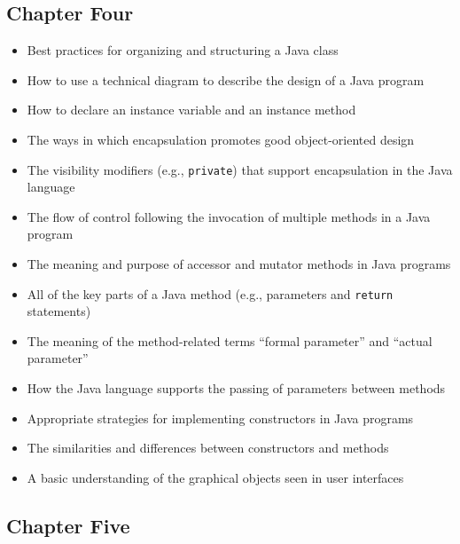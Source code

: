 \documentclass[11pt]{article}
\begin{document}
\subsection*{Chapter Four}

\begin{itemize}

  \itemsep 0in

  \item Best practices for organizing and structuring a Java class

  \item How to use a technical diagram to describe the design of a Java program

  \item How to declare an instance variable and an instance method

  \item The ways in which encapsulation promotes good object-oriented design

  \item The visibility modifiers (e.g., {\tt private}) that support encapsulation in the Java language

  \item The flow of control following the invocation of multiple methods in a
    Java program

  \item The meaning and purpose of accessor and mutator methods in Java programs

  \item All of the key parts of a Java method (e.g., parameters and {\tt return} statements)

  \item The meaning of the method-related terms ``formal parameter'' and ``actual parameter''

  \item How the Java language supports the passing of parameters between methods

  \item Appropriate strategies for implementing constructors in Java programs

  \item The similarities and differences between constructors and methods

  \item A basic understanding of the graphical objects seen in user interfaces

\end{itemize}

\subsection*{Chapter Five}
\end{document}
